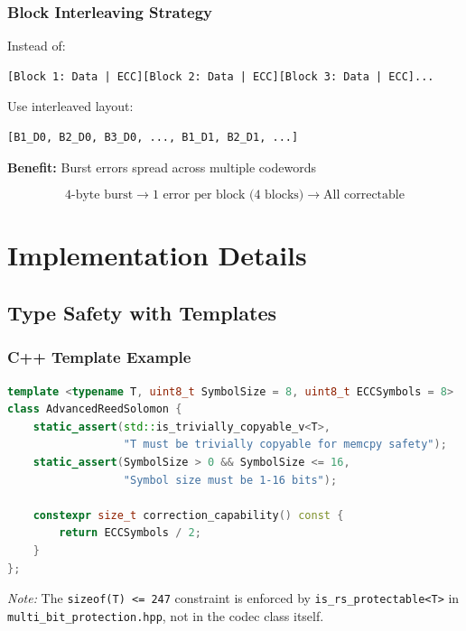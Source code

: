 \documentclass[11pt,a4paper]{article}
\begin{document}
\subsubsection{Block Interleaving Strategy}

Instead of:
\begin{verbatim}
[Block 1: Data | ECC][Block 2: Data | ECC][Block 3: Data | ECC]...
\end{verbatim}

Use interleaved layout:
\begin{verbatim}
[B1_D0, B2_D0, B3_D0, ..., B1_D1, B2_D1, ...]
\end{verbatim}

\textbf{Benefit:} Burst errors spread across multiple codewords

\begin{equation}
\text{4-byte burst} \to \text{1 error per block (4 blocks)} \to \text{All correctable}
\end{equation}

\newpage
\section{Implementation Details}

\subsection{Type Safety with Templates}

\subsubsection{C++ Template Example}

\begin{lstlisting}[language=C++, basicstyle=\small\ttfamily]
template <typename T, uint8_t SymbolSize = 8, uint8_t ECCSymbols = 8>
class AdvancedReedSolomon {
    static_assert(std::is_trivially_copyable_v<T>,
                  "T must be trivially copyable for memcpy safety");
    static_assert(SymbolSize > 0 && SymbolSize <= 16,
                  "Symbol size must be 1-16 bits");

    constexpr size_t correction_capability() const {
        return ECCSymbols / 2;
    }
};
\end{lstlisting}

\textit{Note:} The \texttt{sizeof(T) <= 247} constraint is enforced by \texttt{is\_rs\_protectable<T>} in \texttt{multi\_bit\_protection.hpp}, not in the codec class itself.
\end{document}
